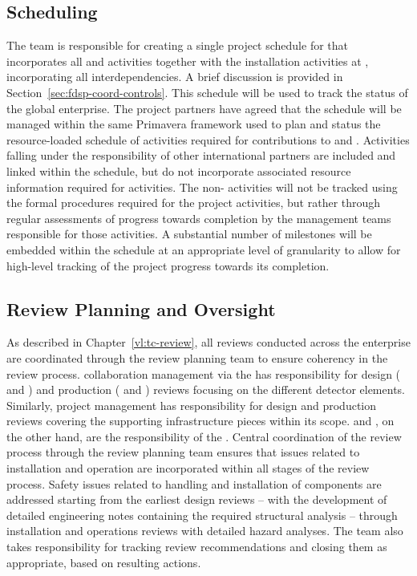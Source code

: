 \subsection{Scheduling}
\label{sec:dune_schedule}

The  team is responsible for creating a single project
schedule for  that incorporates all  and
 activities together with the installation activities at
, incorporating all interdependencies. A brief discussion
is provided in Section~\ref{sec:fdsp-coord-controls}. This schedule
will be used to track the status of the global enterprise.  The
project partners have agreed that the  schedule 
will be managed within the same Primavera  framework used 
to plan and status the resource-loaded schedule of activities required 
for   contributions to  and .
Activities falling under the responsibility of other international
partners are included and linked within the  schedule, but 
do not incorporate associated resource information required for  
 activities.  The non- activities will not be 
tracked using the formal  procedures required for the 
 project activities, but rather through regular assessments 
of progress towards completion by the management teams responsible 
for those activities.  A substantial number of milestones will be 
embedded within the schedule at an appropriate level of granularity 
to allow for high-level tracking of the project progress towards its 
completion.

\subsection{Review Planning and Oversight}
\label{sec:dune_review}

As described in Chapter~\ref{vl:tc-review}, all reviews conducted 
across the  enterprise are coordinated through 
the  review planning team to ensure coherency in the 
review process.   collaboration management via the 
 has responsibility for design ( and 
) and production ( and ) 
reviews focusing on the different detector elements.  Similarly, 
 project management has responsibility for design 
and production reviews covering the supporting infrastructure 
pieces within its scope.   and , on the 
other hand, are the responsibility of the .  Central 
coordination of the review process through the  review 
planning team ensures that issues related to installation and 
operation are incorporated within all stages of the review process.  
Safety issues related to handling and installation of components 
are addressed starting from the earliest design reviews -- with the 
development of detailed engineering notes containing the required 
structural analysis -- through installation and operations reviews 
with detailed hazard analyses.  The  team also takes 
responsibility for tracking review recommendations and closing 
them as appropriate, based on resulting actions.

